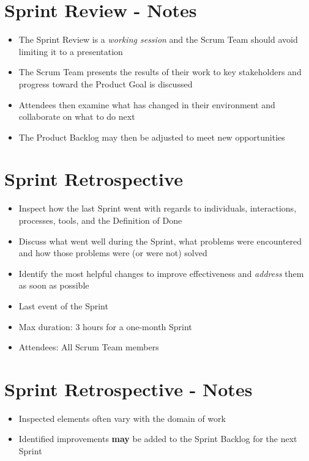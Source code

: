 \documentclass[a4paper,11pt,twocolumn]{article}
\begin{document}
\section*{Sprint Review - Notes}
\begin{itemize}
	\item The Sprint Review is a \textit{working session} and the Scrum Team should avoid limiting it to a presentation
	\item The Scrum Team presents the results of their work to key stakeholders and progress toward the Product Goal is discussed
	\item Attendees then examine what has changed in their environment and collaborate on what to do next
	\item The Product Backlog may then be adjusted to meet new opportunities
\end{itemize}

\section*{Sprint Retrospective}
\begin{itemize}
	\item Inspect how the last Sprint went with regards to individuals, interactions, processes, tools, and the Definition of Done
	\item Discuss what went well during the Sprint, what problems were encountered and how those problems were (or were not) solved
	\item Identify the most helpful changes to improve effectiveness and \textit{address} them as soon as possible
	\item Last event of the Sprint
	\item Max duration: 3 hours for a one-month Sprint
	\item Attendees: All Scrum Team members
\end{itemize}


\section*{Sprint Retrospective - Notes}
\begin{itemize}
	\item Inspected elements often vary with the domain of work
	\item Identified improvements \textbf{may} be added to the Sprint Backlog for the next Sprint
\end{itemize}
\end{document}
